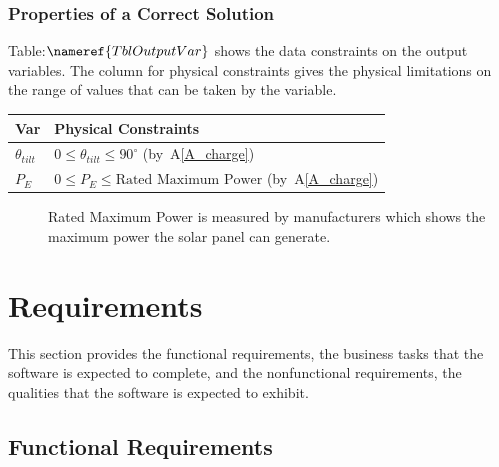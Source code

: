 \documentclass[12pt]{article}
\newcommand{\aref}[1]{A\ref{#1}}
\begin{document}
\subsubsection{Properties of a Correct Solution} \label{sec_CorrectSolution}

\noindent
Table:$\nameref{TblOutputVar}$ shows the data constraints on the output variables. The column
for physical constraints gives the physical limitations on the range of values that can be
taken by the variable.

\begin{table}[!h]
\caption{Output Variables} \label{TblOutputVar}
\renewcommand{\arraystretch}{1.2}
\noindent \begin{longtable*}{l l} 
  \toprule
  \textbf{Var} & \textbf{Physical Constraints} \\
  \midrule 
  $\theta_{tilt}$ & $0 \leq \theta_{tilt} \leq 90^\circ$ (by~\aref{A_charge})\\
  $P_E$ & $0 \leq P_E \leq \text{Rated Maximum Power}$ (by~\aref{A_charge})
  \\
  \bottomrule
\end{longtable*}
\end{table}

\begin{description}

\item[ ] Rated Maximum Power is measured by manufacturers which shows the 
maximum power the solar panel can generate.

\end{description}

\section{Requirements}

This section provides the functional requirements, the business tasks that the
software is expected to complete, and the nonfunctional requirements, the
qualities that the software is expected to exhibit.



\subsection{Functional Requirements}
\end{document}
